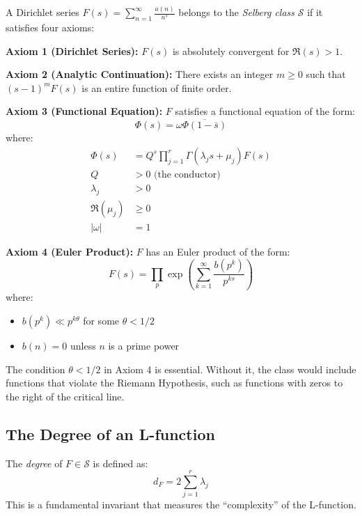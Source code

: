 \begin{definition}
A Dirichlet series $F(s) = \sum_{n=1}^{\infty} \frac{a(n)}{n^s}$ belongs to the \emph{Selberg class} $\mathcal{S}$ if it satisfies four axioms:

\textbf{Axiom 1 (Dirichlet Series):} $F(s)$ is absolutely convergent for $\Re(s) > 1$.

\textbf{Axiom 2 (Analytic Continuation):} There exists an integer $m \geq 0$ such that $(s-1)^m F(s)$ is an entire function of finite order.

\textbf{Axiom 3 (Functional Equation):} $F$ satisfies a functional equation of the form:
\begin{equation}
\Phi(s) = \omega \overline{\Phi(1-\bar{s})}
\end{equation}
where:
\begin{align}
\Phi(s) &= Q^s \prod_{j=1}^r \Gamma(\lambda_j s + \mu_j) F(s) \\
Q &> 0 \text{ (the conductor)} \\
\lambda_j &> 0 \\
\Re(\mu_j) &\geq 0 \\
|\omega| &= 1
\end{align}

\textbf{Axiom 4 (Euler Product):} $F$ has an Euler product of the form:
\begin{equation}
F(s) = \prod_p \exp\left(\sum_{k=1}^{\infty} \frac{b(p^k)}{p^{ks}}\right)
\end{equation}
where:
\begin{itemize}
\item $b(p^k) \ll p^{k\theta}$ for some $\theta < 1/2$
\item $b(n) = 0$ unless $n$ is a prime power
\end{itemize}
\end{definition}

\begin{remark}
The condition $\theta < 1/2$ in Axiom 4 is essential. Without it, the class would include functions that violate the Riemann Hypothesis, such as functions with zeros to the right of the critical line.
\end{remark}

\subsection{The Degree of an L-function}

\begin{definition}[Degree]
The \emph{degree} of $F \in \mathcal{S}$ is defined as:
\begin{equation}
d_F = 2\sum_{j=1}^r \lambda_j
\end{equation}
This is a fundamental invariant that measures the ``complexity'' of the L-function.
\end{definition}

